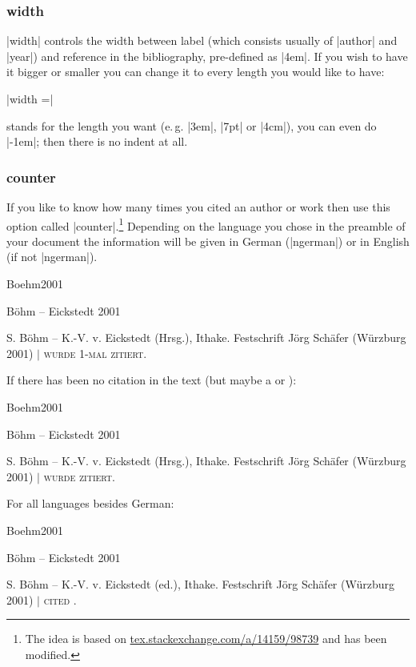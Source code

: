 \documentclass[a4paper,
10pt,
greek,
french,
spanish,
italian,
ngerman,
english
]{ltxdoc}
\begin{document}
 
\subsubsection{width}\label{width}
|width| controls the width between label (which consists usually of |author| and |year|) and reference in the bibliography, pre-defined as |4em|.
If you wish to have it bigger or smaller you can change it to every length you would like to have:

|width =| 

 stands for the length you want (e.\,g. |3em|, |7pt| or |4cm|), you can even do |-1em|; 
then there is no indent at all.

\subsubsection{counter}\label{counter}
If you like to know how many times you cited an author or work then use this option called |counter|.\footnote{The idea is based on \href{http://tex.stackexchange.com/a/14159/98739}{tex.stackexchange.com/a/14159/98739} and has been modified.} 
Depending on the language you chose in the preamble of your document the information will be given in German (|ngerman|) or in English (if not |ngerman|).

\begin{bibbox}{Boehm2001}\footnotesize
\parbox[t]{3cm}{Böhm – Eickstedt 2001} \parbox[t]{8cm}{%
S. Böhm – K.-V. v. Eickstedt (Hrsg.), Ithake. Festschrift Jörg Schäfer (Würzburg 2001)  $\vert$  {\scshape  wurde 1-mal zitiert.}}
\end{bibbox}

If there has been no citation in the text (but maybe a  or ):
\begin{bibbox}{Boehm2001}\footnotesize
\parbox[t]{3cm}{Böhm – Eickstedt 2001} \parbox[t]{8cm}{%
S. Böhm – K.-V. v. Eickstedt (Hrsg.), Ithake. Festschrift Jörg Schäfer (Würzburg 2001)  $\vert$  {\scshape  wurde {\color{red}{keinmal}} zitiert.}}
\end{bibbox} 

For all languages besides German:
\begin{bibbox}{Boehm2001}\footnotesize
\parbox[t]{3cm}{Böhm – Eickstedt 2001} \parbox[t]{8cm}{%
S. Böhm – K.-V. v. Eickstedt (ed.), Ithake. Festschrift Jörg Schäfer (Würzburg 2001) $\vert$  {\scshape cited {{\color{red}{not once}}}.}}
\end{bibbox}
  
\end{document}
